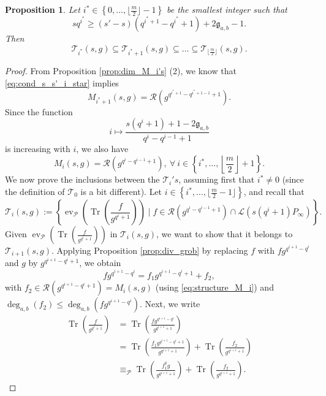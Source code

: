 \documentclass[a4paper]{amsart}
\newtheorem{proposition}[thm]{Proposition}
\theoremstyle{definition}
\theoremstyle{remark}
\DeclareMathOperator{\ev}{ev}
\DeclareMathOperator{\trace}{Tr}
\newcommand{\calP}{\mathcal{P}}
\newcommand{\calL}{\mathcal{L}}
\newcommand{\calR}{\mathcal{R}}
\newcommand{\calT}{\mathcal{T}}
\newcommand{\Tr}[1]{\trace\!\left(#1\right)}
\newcommand{\set}[1]{\left\{#1\right\}}
\newcommand{\degab}[1]{\deg_{a,b}\left(#1\right)}
\begin{document}
\begin{proposition} \label{prop:inclusion_T_i's} Let $i^* \in \set{0,\dots,\lfloor\frac{m}{2}\rfloor-1}$ be the smallest integer such that 
\begin{equation} \label{eq:cond_s_s'_i_star}
sq^{i^*} \geq (s'-s)(q^{i^*+1}-q^{i^{*}}+1)+2\mathfrak{g}_{a,b}-1.
\end{equation} 
Then
$$\calT_{i^*}(s,g) \subseteq \calT_{i^*+1}(s,g) \subseteq \dots \subseteq \calT_{\lfloor \frac{m}{2}\rfloor}(s,g).$$
\end{proposition}
\begin{proof}
From Proposition \ref{prop:dim_M_i's} (2), we know that \eqref{eq:cond_s_s'_i_star} implies $$M_{i^*+1}(s,g) = \calR(g^{q^{i^*+1}-q^{i^*+1-1}+1}).$$ 
Since the function $$i \mapsto \dfrac{s(q^i+1)+1-2\mathfrak{g}_{a,b}}{q^i-q^{i-1}+1}$$ 
is increasing with $i$, we also have
\begin{equation} \label{eq:structure_M_i}
M_{i}(s,g) = \calR(g^{q^{i}-q^{i-1}+1}), \ \forall \ i \in \set{i^*,\dots,\left\lfloor \frac{m}{2}\right\rfloor+1}.
\end{equation} 
We now prove the inclusions between the $\calT_i's$, assuming first that $i^* \neq 0$ (since the definition of $\calT_0$ is a bit different). Let $i \in \set{i^*,\dots,\lfloor \frac{m}{2}-1 \rfloor}$, and recall that 
$$\calT_i(s,g):=\set{\ev_{\calP}\left(\Tr{\frac{f}{g^{q^i+1}}}\right) \mid f \in \calR\left(g^{q^i-q^{i-1}+1}\right)  \cap \calL(s(q^i+1)P_\infty)}.$$
Given $\ev_{\calP}\left(\Tr{\frac{f}{g^{q^i+1}}}\right)$ in $\calT_i(s,g)$, we want to show that it belongs to $\calT_{i+1}(s,g)$. Applying Proposition \ref{prop:div_grob} by replacing $f$ with $fg^{q^{i+1}-q^i}$ and $g$ by $g^{q^{i+1}-q^i+1}$, we obtain
\begin{equation} \label{eq:division_i}
fg^{q^{i+1}-q^i} = f_1g^{q^{i+1}-q^i+1} + f_2,
\end{equation}
with $f_2 \in \calR(g^{q^{i+1}-q^i+1}) = M_i(s,g)$ (using \eqref{eq:structure_M_i}) and $\degab{f_2} \leq \degab{fg^{q^{i+1}-q^i}}$. Next, we write
\begin{align*}
    \Tr{\frac{f}{g^{q^i+1}}} &= \Tr{\frac{fg^{q^{i+1}-q^i}}{g^{q^{i+1}+1}}} \\
                             &= \Tr{\frac{f_1g^{q^{i+1}-q^i+1}}{g^{q^{i+1}+1}}} + \Tr{\frac{f_2}{g^{q^{i+1}+1}}} \\
                             &\equiv_{\calP} \Tr{\frac{f_1^qg}{g^{q^{i+1}+1}}} + \Tr{\frac{f_2}{g^{q^{i+1}+1}}}.
\end{align*}

\end{proof}
\end{document}
